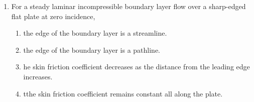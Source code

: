 \documentclass[journal]{IEEEtran}
\begin{document}
\begin{enumerate} [start=14]
\begin{enumerate}
\end{enumerate}
\bigskip
\item For a steady laminar incompressible boundary layer flow over a sharp-edged flat plate at zero incidence,
\begin{enumerate}
     \item the edge of the boundary layer is a streamline.
    \item the edge of the boundary layer is a pathline.
    \item he skin friction coefficient decreases as the distance from the leading edge increases.
     \item tthe skin friction coefficient remains constant all along the plate.
\end{enumerate}








\end{enumerate}
\end{document}
